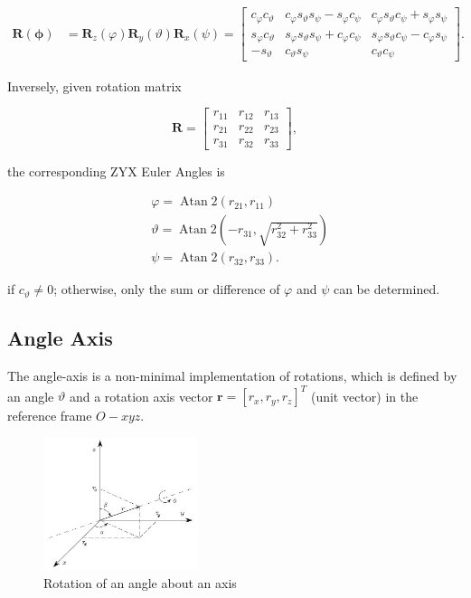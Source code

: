 \documentclass[10pt]{article}
\begin{document}
 
 

$$
\begin{aligned}
\boldsymbol{R}(\boldsymbol{\phi}) & =\boldsymbol{R}_{z}(\varphi) \boldsymbol{R}_{y}(\vartheta) \boldsymbol{R}_{x}(\psi)  =\left[\begin{array}{ccc}
c_{\varphi} c_{\vartheta} & c_{\varphi} s_{\vartheta} s_{\psi}-s_{\varphi} c_{\psi} & c_{\varphi} s_{\vartheta} c_{\psi}+s_{\varphi} s_{\psi} \\
s_{\varphi} c_{\vartheta} & s_{\varphi} s_{\vartheta} s_{\psi}+c_{\varphi} c_{\psi} & s_{\varphi} s_{\vartheta} c_{\psi}-c_{\varphi} s_{\psi} \\
-s_{\vartheta} & c_{\vartheta} s_{\psi} & c_{\vartheta} c_{\psi}
\end{array}\right] .
\end{aligned}
$$

\bigskip
Inversely, given rotation matrix

$$
\boldsymbol{R}=\left[\begin{array}{lll}
r_{11} & r_{12} & r_{13} \\
r_{21} & r_{22} & r_{23} \\
r_{31} & r_{32} & r_{33}
\end{array}\right],
$$

the corresponding ZYX  Euler Angles is  

$$
\begin{aligned}
& \varphi=\operatorname{Atan} 2\left(r_{21}, r_{11}\right) \\
& \vartheta=\operatorname{Atan} 2\left(-r_{31}, \sqrt{r_{32}^{2}+r_{33}^{2}}\right) \\
& \psi=\operatorname{Atan} 2\left(r_{32}, r_{33}\right) .
\end{aligned}
$$

if $c_{\vartheta}\not=0$; otherwise,  only the sum or difference of $\varphi$ and $\psi$ can be determined.



\subsection{Angle Axis}
The angle-axis is a non-minimal implementation of rotations, which is defined by an angle $\vartheta$ and a rotation axis vector $\boldsymbol{r}=\left[r_{x}, r_{y},  r_{z}\right]^{T}$ (unit vector) in the reference frame $O- x y z$. 

\begin{figure}[h]
    \centering
   \includegraphics[max width=0.4\textwidth]{./kinematics/angle_axis}
    \caption{Rotation of an angle about an axis}
    \label{c1.fig.axis-angle}
\end{figure}
\end{document}
